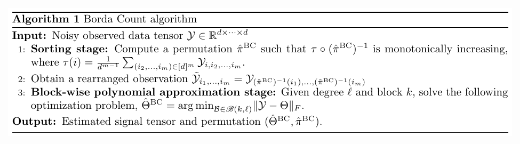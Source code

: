 \documentclass{article}
\theoremstyle{definition}
\begin{document}
\vspace{-.3cm}
\begin{center}
\includegraphics[width=1\textwidth]{figures/algorithm_template.pdf}
\end{center}
\vspace{-.4cm}
\end{document}
